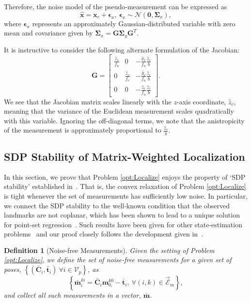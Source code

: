 \documentclass[lettersize,journal]{IEEEtran}
\newcommand{\EdgeSet}{\vec{\bm{\mathcal{E}}}}
\newcommand{\VertSetP}{\bm{\mathcal{V}}_p}
\newtheorem{definition}[theorem]{Definition}
\begin{document}
Therefore, the noise model of the pseudo-measurement can be expressed as
\begin{equation}
	 \hat{\bm{x}} = \bm{x}_c + \bm{\epsilon}_x, ~ \bm{\epsilon}_x \sim \mathcal{N}(\bm{0}, \bm{\Sigma}_x),
\end{equation}
where $ \bm{\epsilon}_x $ represents an approximately Gaussian-distributed variable with zero mean and covariance given by $ \bm{\Sigma}_x = \bm{G}\bm{\Sigma}_y \bm{G}^T $.

It is instructive to consider the following alternate formulation of the Jacobian:
\begin{equation}\label{eqn:stereo_jac}
	\bm{G} =\begin{bmatrix}
		\frac{\hat{z}_c}{f_u} & 0 & -\frac{\hat{x}_c}{f_u }\frac{\hat{z}_c}{b} \\
		0 & \frac{\hat{z}_c}{f_v } & -\frac{\hat{y}_c}{f_u }\frac{\hat{z}_c}{b} \\
		0 & 0 & -\frac{\hat{z}_c}{f_u}\frac{\hat{z}_c}{b}
	\end{bmatrix}.
\end{equation}
We see that the Jacobian matrix scales linearly with the $z$-axis coordinate, $\hat{z}_c$, meaning that the variance of the Euclidean measurement scales quadratically with this variable. Ignoring the off-diagonal terms, we note that the anistropicity of the measurement is approximately proportional to $\frac{\hat{z}_c}{b}$.

\subsection{SDP Stability of Matrix-Weighted Localization}\label{App:SDPStability}

In this section, we prove that Problem \eqref{opt:Localize} enjoys the property of `SDP stability' established in~\cite{cifuentesLocalStabilitySemidefinite2022}. That is, the convex relaxation of Problem \eqref{opt:Localize} is tight whenever the set of measurements has sufficiently low noise. In particular, we connect the SDP stability to the well-known condition that the observed landmarks are not coplanar, which has been shown to lead to a unique solution for point-set regression~\cite{arunLeastSquaresFittingTwo1987}. Such results have been given for other state-estimation problems~\cite{rosenSESyncCertifiablyCorrect2019, tianDistributedCertifiablyCorrect2021} and our proof closely follows the development given in~\cite{wiseCertifiablyOptimalMonocular2020}.

\begin{definition}[Noise-free Measurements]
	Given the setting of Problem \eqref{opt:Localize}, we define the set of \emph{noise-free measurements} for a given set of poses, $\left\{(\bar{\bm{C}}_{i}, \bar{\bm{t}}_i) ~ \forall i \in \VertSetP \right\}$, as
	\begin{equation}
		\left\{\bar{\bm{m}}_i^{ki} = \bar{\bm{C}}_{i} \bm{m}_{0,}^{k0} - \bar{\bm{t}}_i,~ \forall (i,k)\in \EdgeSet_m\right\},
	\end{equation}
	and collect all such measurements in a vector, $\bar{\bm{m}}$.
\end{definition}
\end{document}
